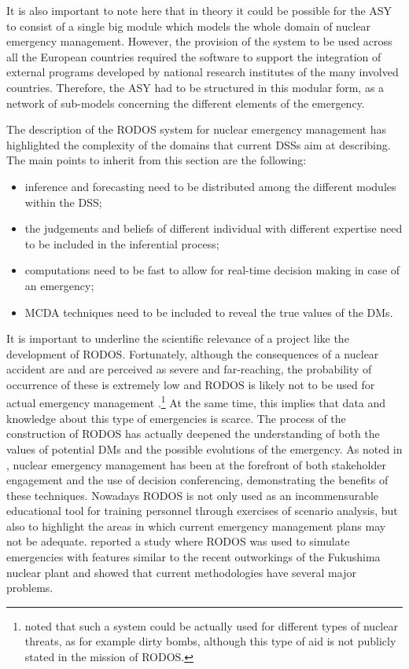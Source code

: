 It is also important to note here that in theory it could be possible for the ASY to consist of a single big module which models the whole domain of nuclear emergency management. However, the provision of the system to be used across all the European countries required the software to support the integration of external programs developed by national research institutes of the many involved countries. Therefore, the ASY had to be structured in this modular form, as a network of sub-models concerning the different elements of the emergency.

The description of the RODOS system for nuclear emergency management has highlighted the complexity of the domains that current  DSSs aim at describing. The main points to inherit from this section are the following:
\begin{itemize}
\item inference and forecasting need to be distributed among the different modules within the DSS;
\item the judgements and beliefs of different individual with different expertise need to be included in the inferential process;
\item computations need to be fast to allow for real-time decision making in case of an emergency;
\item MCDA techniques need to be included to reveal the true values of the DMs.
\end{itemize}

It is important to underline the scientific relevance of a project like the development of RODOS. Fortunately, although the consequences of a nuclear accident are and are perceived as severe and far-reaching,  the probability of occurrence of these is extremely low and RODOS is likely not to be used for actual emergency management \citep{Geldermann2009}.\footnote{\citet{Walle2008} noted that such a system could be actually used for different types of nuclear threats, as for example dirty bombs, although this type of aid is not publicly stated in the mission of RODOS.} At the same time, this implies that data and knowledge about this type of emergencies is scarce. The process of the construction of RODOS has actually deepened the understanding of both the values of potential DMs and the possible evolutions of the emergency. As noted in \citet{Papamichail2013}, nuclear emergency management has been at the forefront of both  stakeholder engagement and the use of decision conferencing, demonstrating the benefits of these techniques. Nowadays RODOS is not only used as an incommensurable educational tool for training personnel through exercises of scenario analysis, but also to highlight the areas in which current emergency management plans may not be adequate. \citet{Gering2013} reported a study where RODOS was used to simulate emergencies with features similar to the recent outworkings of the Fukushima nuclear plant and showed that current methodologies have several major problems. 

